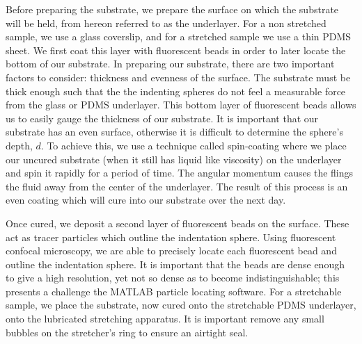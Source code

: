 Before preparing the substrate, we prepare the surface on which the substrate will be held, from hereon referred to as the underlayer. For a non stretched sample, we use a glass coverslip, and for a stretched sample we use a thin PDMS sheet.  We first coat this layer with fluorescent beads in order to later locate the bottom of our substrate. In preparing our substrate, there are two important factors to consider: thickness and evenness of the surface. The substrate must be thick enough such that the the indenting spheres do not feel a measurable force from the glass or PDMS underlayer. This bottom layer of fluorescent beads allows us to easily gauge the thickness of our substrate. It is important that our substrate has an even surface, otherwise it is difficult to determine the sphere's depth, $ d $. To achieve this, we use a technique called spin-coating where we place our uncured substrate (when it still has liquid like viscosity) on the underlayer and spin it rapidly for a period of time. The angular momentum causes the flings the fluid away from the center of the underlayer. The result of this process is an even coating which will cure into our substrate over the next day.

Once cured, we deposit a second layer of fluorescent beads on the surface. These act as tracer particles which outline the indentation sphere. Using fluorescent confocal microscopy, we are able to precisely locate each fluorescent bead and outline the indentation sphere. It is important that the beads are dense enough to give a high resolution, yet not so dense as to become indistinguishable; this presents a challenge the MATLAB particle locating software. For a stretchable sample, we place the substrate, now cured onto the stretchable PDMS underlayer, onto the lubricated stretching apparatus. It is important remove any small bubbles on the stretcher's ring to ensure an airtight seal. 


